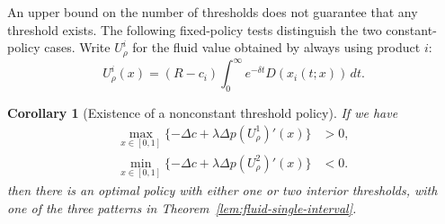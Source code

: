 \documentclass[11pt]{article}
\newtheorem{corollary}{Corollary}
\begin{document}
An upper bound on the number of thresholds does not guarantee that any threshold exists. The following fixed-policy tests distinguish the two
constant-policy cases. Write $U^i_\rho$ for the fluid value obtained by always using product $i$:
\begin{equation*}
U^i_\rho(x)=(R-c_i)\int_0^\infty e^{-\delta t}D(x_i(t;x))\,dt.
\end{equation*}

\begin{corollary}[Existence of a nonconstant threshold policy]
\label{cor:fluid-nonconstant-threshold}
If we have 
\begin{align*}
\max_{x\in[0,1]}\{-\Delta c+\lambda\Delta p(U^1_\rho)'(x)\}&>0,\\
\min_{x\in[0,1]}\{-\Delta c+\lambda\Delta p(U^2_\rho)'(x)\}&<0.
\end{align*}
then there is an optimal policy with either one
or two interior thresholds, with one of the three patterns in
Theorem~\ref{lem:fluid-single-interval}.
\end{corollary}
\end{document}
